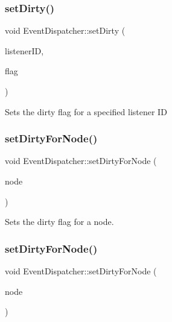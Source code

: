 \subsubsection{\texorpdfstring{set\+Dirty()}{setDirty()}\hspace{0.1cm}{\footnotesize\ttfamily [2/2]}}
{\footnotesize\ttfamily void Event\+Dispatcher\+::set\+Dirty (\begin{DoxyParamCaption}\item[{const Event\+Listener\+::\+Listener\+ID \&}]{listener\+ID,  }\item[{\hyperlink{classEventDispatcher_a05d949544dae4e41a1ba912ab962db33}{Dirty\+Flag}}]{flag }\end{DoxyParamCaption})\hspace{0.3cm}{\ttfamily [protected]}}

Sets the dirty flag for a specified listener ID \mbox{\label{classEventDispatcher_ad6b4737e5007cd150b894a49d8f6ea28}} 
\subsubsection{\texorpdfstring{set\+Dirty\+For\+Node()}{setDirtyForNode()}\hspace{0.1cm}{\footnotesize\ttfamily [1/2]}}
{\footnotesize\ttfamily void Event\+Dispatcher\+::set\+Dirty\+For\+Node (\begin{DoxyParamCaption}\item[{\hyperlink{classNode}{Node} $\ast$}]{node }\end{DoxyParamCaption})\hspace{0.3cm}{\ttfamily [protected]}}

Sets the dirty flag for a node. \mbox{\label{classEventDispatcher_ad6b4737e5007cd150b894a49d8f6ea28}} 
\subsubsection{\texorpdfstring{set\+Dirty\+For\+Node()}{setDirtyForNode()}\hspace{0.1cm}{\footnotesize\ttfamily [2/2]}}
{\footnotesize\ttfamily void Event\+Dispatcher\+::set\+Dirty\+For\+Node (\begin{DoxyParamCaption}\item[{\hyperlink{classNode}{Node} $\ast$}]{node }\end{DoxyParamCaption})\hspace{0.3cm}{\ttfamily [protected]}}

